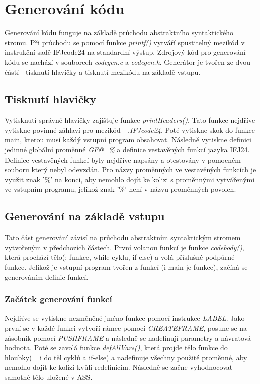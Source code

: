 \documentclass[a4paper, 12pt]{article}
\begin{document}
\newpage
{}
\section{Generování kódu}
Generování kódu funguje na základě průchodu abstraktního syntaktického stromu. Při průchodu se pomocí funkce \textit{printf()} vytváří spustitelný mezikód v instrukční sadě IFJcode24 na standardní výstup. Zdrojový kód pro generování kódu se nachází v souborech \textit{codegen.c} a \textit{codegen.h}. Generátor je tvořen ze dvou částí - tisknutí hlavičky a tisknutí mezikódu na základě vstupu.

\subsection{Tisknutí hlavičky}
Vytisknutí správné hlavičky zajišťuje funkce \textit{printHeaders()}. Tato funkce nejdříve vytiskne povinné záhlaví pro mezikód - \textit{.IFJcode24}. Poté vytiskne skok do funkce main, kterou musí každý vstupní program obsahovat. Následně vytiskne definici jedinné globální proměnné \textit{GF@\_\%} a definice vestavěných funkcí jazyka IFJ24. Definice vestavěných funkcí byly nejdříve napsány a otestovány v pomocném souboru který nebyl odevzdán. Pro názvy proměnných ve vestavěných funkcích je využit znak '\%' na konci, aby nemohlo dojít ke kolizi s proměnnými vytvářenými ve vstupním programu, jelikož znak '\%' není v názvu proměnných povolen.

\subsection{Generování na základě vstupu}
Tato část generování závisí na průchodu abstraktním syntaktickým stromem vytvořeným v předchozích částech. První volanou funkcí je funkce \textit{codebody()}, která prochází tělo(: funkce, while cyklu, if-else) a volá příslušné podpůrné funkce. Jelikož je vstupní program tvořen z funkcí (i main je funkce), začíná se generováním definic funkcí.
\subsubsection{Začátek generování funkcí}
Nejdříve se vytiskne nezměněné jméno funkce pomocí instrukce \textit{LABEL}. Jako první se v každé funkci vytvoří rámec pomocí \textit{CREATEFRAME}, posune se na zásobník pomocí \textit{PUSHFRAME} a následně se nadefinují parametry a návratová hodnota. Poté se zavolá funkce \textit{defAllVars()}, která projde tělo funkce do hloubky(= i do těl cyklů a if-else) a nadefinuje všechny použité proměnné, aby nemohlo dojít ke kolizi kvůli redefinicím. Následně se začne vyhodnocovat samotné tělo uložené v ASS. 
\end{document}
